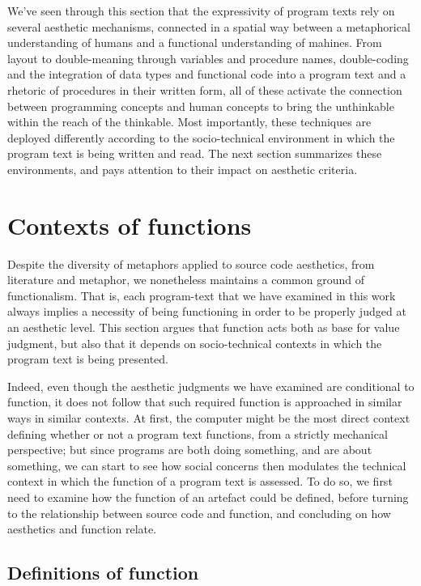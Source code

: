We've seen through this section that the expressivity of program texts rely on several aesthetic mechanisms, connected in a spatial way between a metaphorical understanding of humans and a functional understanding of mahines. From layout to double-meaning through variables and procedure names, double-coding and the integration of data types and functional code into a program text and a rhetoric of procedures in their written form, all of these activate the connection between programming concepts and human concepts to bring the unthinkable within the reach of the thinkable. Most importantly, these techniques are deployed differently according to the socio-technical environment in which the program text is being written and read. The next section summarizes these environments, and pays attention to their impact on aesthetic criteria.

\section{Contexts of functions} %
\label{sec:contexts-of-functions}

Despite the diversity of metaphors applied to source code aesthetics, from literature and metaphor, we nonetheless maintains a common ground of functionalism. That is, each program-text that we have examined in this work always implies a necessity of being functioning in order to be properly judged at an aesthetic level. This section argues that function acts both as base for value judgment, but also that it depends on socio-technical contexts in which the program text is being presented.

Indeed, even though the aesthetic judgments we have examined are conditional to function, it does not follow that such required function is approached in similar ways in similar contexts. At first, the computer might be the most direct context defining whether or not a program text functions, from a strictly mechanical perspective; but since programs are both doing something, and are about something, we can start to see how social concerns then modulates the technical context in which the function of a program text is assessed. To do so, we first need to examine how the function of an artefact could be defined, before turning to the relationship between source code and function, and concluding on how aesthetics and function relate.

\subsection{Definitions of function}
\label{subsec:definitions-function}

